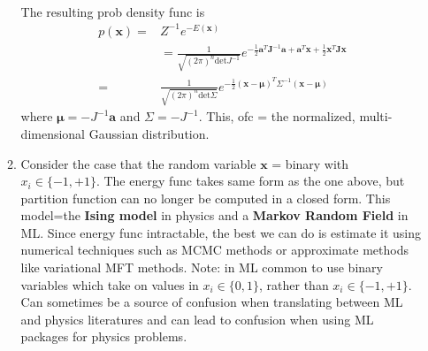 \documentclass[norsk,a4paper,11pt]{article}
\begin{document}
\begin{itemize}
\begin{enumerate}
\begin{align}
		\end{align}
		The resulting prob density func is
		\begin{align}
			p(\bm{x}) =& Z^{-1} e^{-E(\bm{x})} \nonumber \\
			&= \frac{1}{\sqrt{(2\pi)^n \text{det} J^{-1}}} e^{-\frac{1}{2} \bm{a}^T \bm{J}^{-1} \bm{a} + \bm{a}^T \bm{x} + \frac{1}{2} \bm{x}^T \bm{J}\bm{x} } \nonumber \\
			=& \frac{1}{\sqrt{(2\pi)^n \text{det} \Sigma}} e^{-\frac{1}{2} (\bm{x} - \bm{\mu})^T \Sigma^{-1} (\bm{x} - \bm{\mu})}
		\end{align}
		where $\bm{\mu} = -J^{-1} \bm{a}$ and $\Sigma = -J^{-1}$. This, ofc = the normalized, multi-dimensional Gaussian distribution.
		\item Consider the case that the random variable $\bm{x}$ = binary with $x_i \in \{ -1, +1 \}$. The energy func takes same form as the one above, but partition function can no longer be computed in a closed form. This model=the \textbf{Ising model} in physics and a \textbf{Markov Random Field} in ML. Since energy func intractable, the best we can do is estimate it using numerical techniques such as MCMC methods or approximate methods like variational MFT methods. Note: in ML common to use binary variables which take on values in $x_i \in \{ 0, 1 \}$, rather than $x_i \in \{ -1, +1 \}$. Can sometimes be a source of confusion when translating between ML and physics literatures and can lead to confusion when using ML packages for physics problems.
	\end{enumerate}
\end{itemize}
\end{document}
